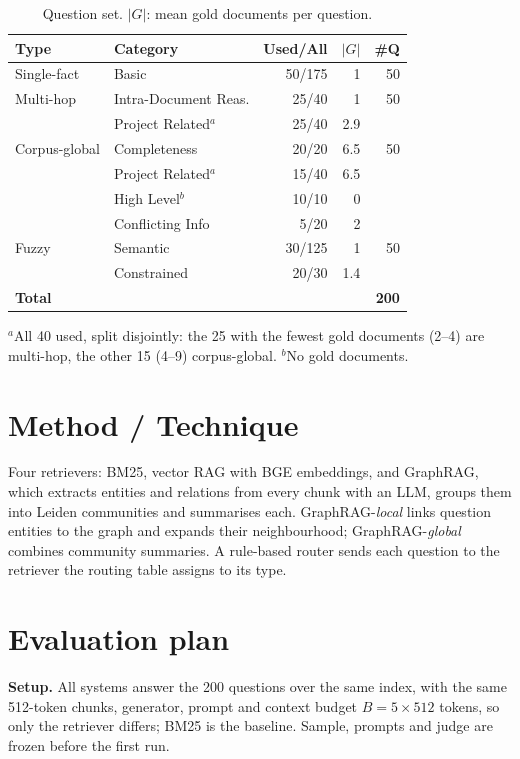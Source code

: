 \documentclass[conference]{IEEEtran}
\begin{document}
\begin{table}[t]
\centering
\caption{Question set. $|G|$: mean gold documents per question.}
\label{tab:questions}
\small
\setlength{\tabcolsep}{4pt}
\begin{tabular}{@{}l l r r r@{}}
\toprule
\textbf{Type} & \textbf{Category} & \textbf{Used/All} & $|G|$ & \textbf{\#Q} \\
\midrule
Single-fact   & Basic                    & 50/175 & 1   & 50 \\
\midrule
Multi-hop     & Intra-Document Reas.     & 25/40  & 1   & 50 \\
              & Project Related$^{a}$    & 25/40  & 2.9 &    \\
\midrule
Corpus-global & Completeness             & 20/20  & 6.5 & 50 \\
              & Project Related$^{a}$    & 15/40  & 6.5 &    \\
              & High Level$^{b}$         & 10/10  & 0   &    \\
              & Conflicting Info         & 5/20   & 2   &    \\
\midrule
Fuzzy         & Semantic                 & 30/125 & 1   & 50 \\
              & Constrained              & 20/30  & 1.4 &    \\
\midrule
\textbf{Total} &                         &        &     & \textbf{200} \\
\bottomrule
\end{tabular}

\vspace{2pt}
\parbox{\columnwidth}{\footnotesize
$^{a}$All 40 used, split disjointly: the 25 with the fewest gold documents (2--4) are multi-hop, the other 15 (4--9) corpus-global.
$^{b}$No gold documents.}
\end{table}

\section{Method / Technique}
Four retrievers: BM25, vector RAG with BGE embeddings, and GraphRAG, which extracts entities and relations from every chunk with an LLM, groups them into Leiden communities and summarises each. GraphRAG-\emph{local} links question entities to the graph and expands their neighbourhood; GraphRAG-\emph{global} combines community summaries. A rule-based router sends each question to the retriever the routing table assigns to its type.

\section{Evaluation plan}
\textbf{Setup.} All systems answer the 200 questions over the same index, with the same 512-token chunks, generator, prompt and context budget $B = 5 \times 512$ tokens, so only the retriever differs; BM25 is the baseline. Sample, prompts and judge are frozen before the first run.
\end{document}
